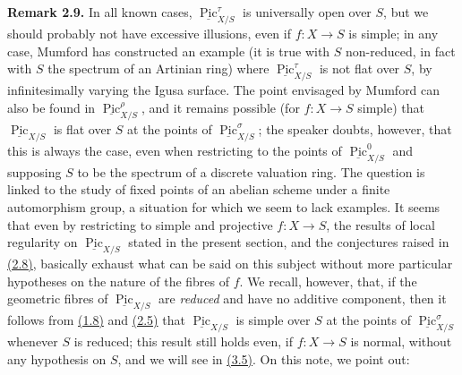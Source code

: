\documentclass{article}
\newenvironment{rmenv}[1]
  {\phantomsection\par\smallskip\noindent\textbf{#1.}\rmfamily}
  {\par\smallskip}
\theoremstyle{definition}
\theoremstyle{definition}
\theoremstyle{definition}
\theoremstyle{definition}
\theoremstyle{remark}
\begin{document}
\leavevmode{}%
\begin{rmenv}{Remark 2.9}
In all known cases, \(\underline{\operatorname{Pic}}_{X/S}^\tau\) is universally open over \(S\), but we should probably not have excessive illusions, even if \(f\colon X\to S\) is simple;
in any case, Mumford has constructed an example (it is true with \(S\) non-reduced, in fact with \(S\) the spectrum of an Artinian ring) where \(\underline{\operatorname{Pic}}_{X/S}^\tau\) is not flat over \(S\), by infinitesimally varying the Igusa surface.
The point envisaged by Mumford can also be found in \(\underline{\operatorname{Pic}}_{X/S}^\rho\), and it remains possible (for \(f\colon X\to S\) simple) that \(\underline{\operatorname{Pic}}_{X/S}\) is flat over \(S\) at the points of \(\underline{\operatorname{Pic}}_{X/S}^\sigma\);
the speaker doubts, however, that this is always the case, even when restricting to the points of \(\underline{\operatorname{Pic}}_{X/S}^0\) and supposing \(S\) to be the spectrum of a discrete valuation ring.
The question is linked to the study of fixed points of an abelian scheme under a finite automorphism group, a situation for which we seem to lack examples.
It seems that even by restricting to simple and projective \(f\colon X\to S\), the results of local regularity on \(\underline{\operatorname{Pic}}_{X/S}\) stated in the present section, and the conjectures raised in \protect\hyperlink{fga-3-vi-remark-2.8}{(2.8)}, basically exhaust what can be said on this subject without more particular hypotheses on the nature of the fibres of \(f\).
We recall, however, that, if the geometric fibres of \(\underline{\operatorname{Pic}}_{X/S}\) are \emph{reduced} and have no additive component, then it follows from \protect\hyperlink{fga-3-vi-corollary-1.8}{(1.8)} and \protect\hyperlink{fga-3-vi-theorem-2.5}{(2.5)} that \(\underline{\operatorname{Pic}}_{X/S}\) is simple over \(S\) at the points of \(\underline{\operatorname{Pic}}_{X/S}^\sigma\) whenever \(S\) is reduced;
this result still holds even, if \(f\colon X\to S\) is normal, without any hypothesis on \(S\), and we will see in \protect\hyperlink{fga-3-vi-theorem-3.5}{(3.5)}.
On this note, we point out:

\end{rmenv}
\end{document}
